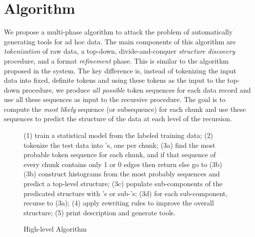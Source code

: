 
\section{Algorithm}\label{sec:algo}

We propose a multi-phase algorithm to attack the problem of
automatically generating tools for ad hoc data. 
The main components of
this algorithm are {\em tokenization} of raw data, 
a top-down, divide-and-conquer {\em structure discovery} procedure,
and a format {\em refinement} phase. This is similar to 
the algorithm proposed in the \learnpads{} system. 
The key difference is, instead of tokenizing the input data into 
fixed, definite tokens and using these tokens as the input to the top-down
procedure, we produce {\em all possible} token sequences for each 
data record and use all these sequences as input to the 
recursive procedure. The goal is to compute the {\em most likely}
sequence (or subsequence) for each chunk and use these sequences to predict the 
structure of the data at each level of the recursion.

\begin{figure}[t]
\begin{centercode}
(1) train a statistical model from the labeled training data;
(2) tokenize the test data into \seqset's, one \seqset{} per chunk;
(3a) find the most probable token sequence for each chunk, and 
     if that sequence of every chunk contains only 1 or 0 edges 
     then return else go to (3b)
(3b) construct histograms from the most probably sequences and 
     predict a top-level structure;
(3c) populate sub-components of the predicated structure with \seqset's
     or sub-\seqset's;
(3d) for each sub-component, recurse to (3a);
(4) apply rewriting rules to improve the overall structure;
(5) print description and generate tools.
\end{centercode}
\caption{High-level Algorithm}\label{fig:algo}
\end{figure}

